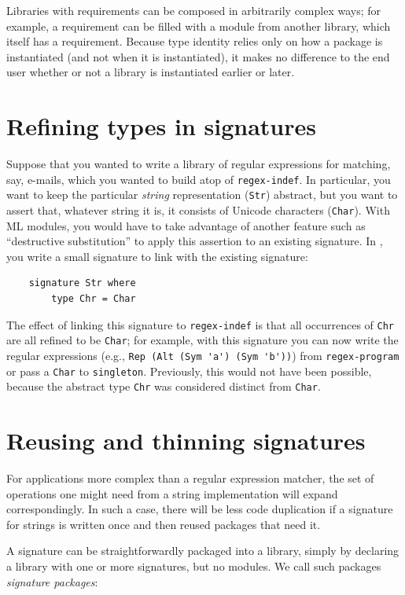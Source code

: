 Libraries with requirements can be composed in arbitrarily complex ways;
for example, a requirement can be filled with a module from another library,
which itself has a requirement.  Because type identity relies
only on how a package is instantiated (and not when it is instantiated),
it makes no difference to the end user whether or not a library
is instantiated earlier or later.

\section{Refining types in signatures}

Suppose that you wanted to write a library of regular expressions for
matching, say, e-mails, which you wanted to build atop of
\texttt{regex-indef}.  In particular, you want to keep the particular
\emph{string} representation (\verb|Str|) abstract, but you want
to assert that, whatever string it is, it consists of Unicode
characters (\verb|Char|).  With ML modules, you would have to take
advantage of another feature such as ``destructive substitution''
to apply this assertion to an existing signature.  In \Backpack{}, you
write a small signature to link with the existing signature:

\begin{lstlisting}
    signature Str where
        type Chr = Char
\end{lstlisting}

\noindent
The effect of linking this signature to \verb|regex-indef| is that
all occurrences of \verb|Chr| are all refined to be \verb|Char|;
for example, with this signature you can now write the regular
expressions (e.g., \verb|Rep (Alt (Sym 'a') (Sym 'b'))|) from
\verb|regex-program| or pass a \verb|Char| to \verb|singleton|.
Previously, this would not have been possible, because the
abstract type \verb|Chr| was considered distinct from \verb|Char|.

\section{Reusing and thinning signatures}

For applications more complex than a regular expression matcher, the set
of operations one might need from a string implementation will expand
correspondingly.  In such a case, there will be less code duplication if
a signature for strings is written once and then reused packages that
need it.

A signature can be straightforwardly packaged into a library, simply
by declaring a library with one or more signatures, but no modules.
We call such packages \emph{signature packages}:

